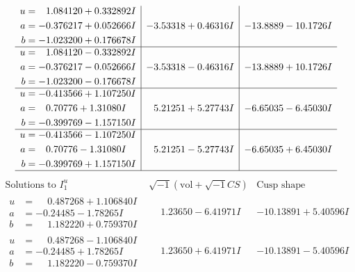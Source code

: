 \documentclass[1p]{elsarticle_modified}
\theoremstyle{definition}
\newcommand{\I}{\sqrt{-1}}
\begin{document}
$$\begin{array}{c|c|c}
\begin{aligned}
u &= \phantom{-}1.084120 + 0.332892 I \\
a &= -0.376217 + 0.052666 I \\
b &= -1.023200 + 0.176678 I\end{aligned}
 & -3.53318 + 0.46316 I & -13.8889 - 10.1726 I \\ \hline\begin{aligned}
u &= \phantom{-}1.084120 - 0.332892 I \\
a &= -0.376217 - 0.052666 I \\
b &= -1.023200 - 0.176678 I\end{aligned}
 & -3.53318 - 0.46316 I & -13.8889 + 10.1726 I \\ \hline\begin{aligned}
u &= -0.413566 + 1.107250 I \\
a &= \phantom{-}0.70776 + 1.31080 I \\
b &= -0.399769 - 1.157150 I\end{aligned}
 & \phantom{-}5.21251 + 5.27743 I & -6.65035 - 6.45030 I \\ \hline\begin{aligned}
u &= -0.413566 - 1.107250 I \\
a &= \phantom{-}0.70776 - 1.31080 I \\
b &= -0.399769 + 1.157150 I\end{aligned}
 & \phantom{-}5.21251 - 5.27743 I & -6.65035 + 6.45030 I\\
 \hline 
 \end{array}$$\newpage$$\begin{array}{c|c|c}  
\text{Solutions to }I^u_{1}& \I (\text{vol} + \sqrt{-1}CS) & \text{Cusp shape}\\
 \hline 
\begin{aligned}
u &= \phantom{-}0.487268 + 1.106840 I \\
a &= -0.24485 - 1.78265 I \\
b &= \phantom{-}1.182220 + 0.759370 I\end{aligned}
 & \phantom{-}1.23650 - 6.41971 I & -10.13891 + 5.40596 I \\ \hline\begin{aligned}
u &= \phantom{-}0.487268 - 1.106840 I \\
a &= -0.24485 + 1.78265 I \\
b &= \phantom{-}1.182220 - 0.759370 I\end{aligned}
 & \phantom{-}1.23650 + 6.41971 I & -10.13891 - 5.40596 I \\ \hline\begin{aligned}

\end{aligned}
\end{array}$$
\end{document}
